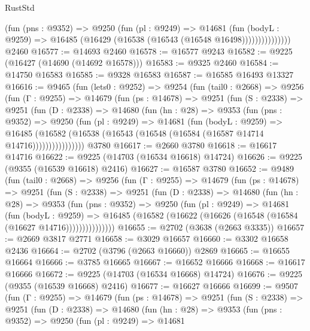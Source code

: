 \begin{lexlean}{RustStd}
\begin{coremodule}
                    (fun (pns : @9352) =>
                    @9250
                      (fun (pl : @9249) =>
                      @14681
                        (fun (bodyL : @9259) =>
                        @16485 (@16429 (@16538 (@16543 (@16548 @16498)))))))))))))))
    @2460
@16577 := @14693 @2460
@16578 := @16577 @9243
@16582 := @9225 (@16427 (@14690 (@14692 @16578)))
@16583 := @9325 @2460
@16584 := @14750 @16583
@16585 := @9328 @16583
@16587 := @16585 @16493 @13327
@16616 := @9465
    (fun (lets0 : @9252) =>
    @9254
      (fun (tail0 : @2668) =>
      @9256
        (fun (Γ : @9255) =>
        @14679
          (fun (ps : @14678) =>
          @9251
            (fun (S : @2338) =>
            @9251
              (fun (D : @2338) =>
              @14680
                (fun (hn : @28) =>
                @9353
                  (fun (pns : @9352) =>
                  @9250
                    (fun (pl : @9249) =>
                    @14681
                      (fun (bodyL : @9259) =>
                      @16485
                        (@16582
                          (@16538 (@16543 (@16548 (@16584 (@16587 @14714 @14716))))))))))))))))
    @3780
@16617 := @2660 @3780
@16618 := @16617 @14716
@16622 := @9225 (@14703 (@16534 @16618) @14724)
@16626 := @9225 (@9355 (@16539 @16618) @2416)
@16627 := @16587 @3780
@16652 := @9489
    (fun (tail0 : @2668) =>
    @9256
      (fun (Γ : @9255) =>
      @14679
        (fun (ps : @14678) =>
        @9251
          (fun (S : @2338) =>
          @9251
            (fun (D : @2338) =>
            @14680
              (fun (hn : @28) =>
              @9353
                (fun (pns : @9352) =>
                @9250
                  (fun (pl : @9249) =>
                  @14681
                    (fun (bodyL : @9259) =>
                    @16485 (@16582 (@16622 (@16626 (@16548 (@16584 (@16627 @14716)))))))))))))))
@16655 := @2702 (@3638 (@2663 @3335))
@16657 := @2669 @3817 @2771
@16658 := @3029 @16657
@16660 := @3302 @16658 @2436
@16664 := @2702 (@3796 (@2663 @16660)) @2869
@16665 := @16655 @16664
@16666 := @3785 @16665
@16667 := @16652 @16666
@16668 := @16617 @16666
@16672 := @9225 (@14703 (@16534 @16668) @14724)
@16676 := @9225 (@9355 (@16539 @16668) @2416)
@16677 := @16627 @16666
@16699 := @9507
    (fun (Γ : @9255) =>
    @14679
      (fun (ps : @14678) =>
      @9251
        (fun (S : @2338) =>
        @9251
          (fun (D : @2338) =>
          @14680
            (fun (hn : @28) =>
            @9353
              (fun (pns : @9352) =>
              @9250
                (fun (pl : @9249) =>
                @14681

\end{coremodule}
\end{lexlean}
